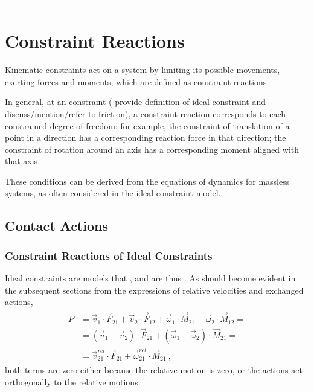 \documentclass[letterpaper,10pt,english]{jupyterBook}
\begin{document}
\bigskip\hrule\bigskip


\sphinxstepscope


\section{Constraint Reactions}
\label{\detokenize{ch/actions-reactions:constraint-reactions}}\label{\detokenize{ch/actions-reactions:classical-mechanics-actions-reactions}}\label{\detokenize{ch/actions-reactions::doc}}
\sphinxAtStartPar
Kinematic constraints act on a system by limiting its possible movements, exerting forces and moments, which are defined as constraint reactions.

\sphinxAtStartPar
In general, at an  constraint ( provide definition of ideal constraint and discuss/mention/refer to friction), a constraint reaction corresponds to each constrained degree of freedom: for example, the constraint of translation of a point in a direction has a corresponding reaction force in that direction; the constraint of rotation around an axis has a corresponding moment aligned with that axis.

\sphinxAtStartPar
These conditions can be derived from the equations of dynamics for massless systems, as often considered in the ideal constraint model.


\subsection{Contact Actions}
\label{\detokenize{ch/actions-reactions:contact-actions}}

\subsubsection{Constraint Reactions of Ideal Constraints}
\label{\detokenize{ch/actions-reactions:constraint-reactions-of-ideal-constraints}}
\sphinxAtStartPar
Ideal constraints are models that , and are thus . As should become evident in the subsequent sections from the expressions of relative velocities and exchanged actions,
\begin{equation*}
\begin{split}\begin{aligned}
P & = \vec{v}_1     \cdot \vec{F}_{21} + \vec{v}_2     \cdot \vec{F}_{12} 
    + \vec{\omega}_1 \cdot \vec{M}_{21} + \vec{\omega}_2 \cdot \vec{M}_{12} = \\ 
  & = ( \vec{v}_1 - \vec{v}_2 ) \cdot \vec{F}_{21}
    + ( \vec{\omega}_1 - \vec{\omega}_2 ) \cdot \vec{M}_{21} = \\ 
  & = \vec{v}^{rel}_{21} \cdot \vec{F}_{21}
    + \vec{\omega}^{rel}_{21} \cdot \vec{M}_{21} \ ,
\end{aligned}\end{split}
\end{equation*}
\sphinxAtStartPar
both terms are zero either because the relative motion is zero, or the actions act orthogonally to the relative motions.
\end{document}
